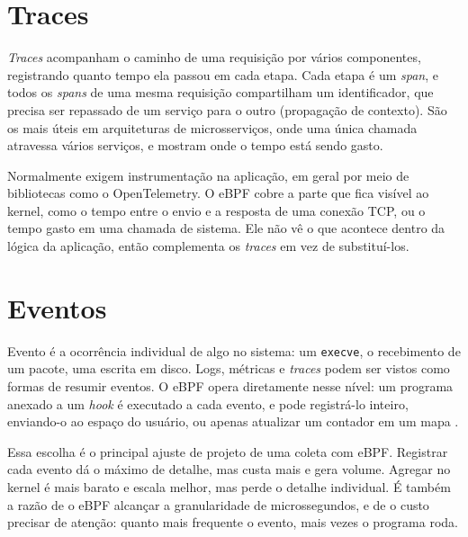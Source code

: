 \section{Traces}

\textit{Traces} acompanham o caminho de uma requisição por vários componentes, registrando quanto tempo ela passou em cada etapa. Cada etapa é um \textit{span}, e todos os \textit{spans} de uma mesma requisição compartilham um identificador, que precisa ser repassado de um serviço para o outro (propagação de contexto). São os mais úteis em arquiteturas de microsserviços, onde uma única chamada atravessa vários serviços, e mostram onde o tempo está sendo gasto.

Normalmente exigem instrumentação na aplicação, em geral por meio de bibliotecas como o OpenTelemetry. O eBPF cobre a parte que fica visível ao kernel, como o tempo entre o envio e a resposta de uma conexão TCP, ou o tempo gasto em uma chamada de sistema. Ele não vê o que acontece dentro da lógica da aplicação, então complementa os \textit{traces} em vez de substituí-los.

\section{Eventos}

Evento é a ocorrência individual de algo no sistema: um \texttt{execve}, o recebimento de um pacote, uma escrita em disco. Logs, métricas e \textit{traces} podem ser vistos como formas de resumir eventos. O eBPF opera diretamente nesse nível: um programa anexado a um \textit{hook} é executado a cada evento, e pode registrá-lo inteiro, enviando-o ao espaço do usuário, ou apenas atualizar um contador em um mapa \cite{gregg2019}.

Essa escolha é o principal ajuste de projeto de uma coleta com eBPF. Registrar cada evento dá o máximo de detalhe, mas custa mais e gera volume. Agregar no kernel é mais barato e escala melhor, mas perde o detalhe individual. É também a razão de o eBPF alcançar a granularidade de microssegundos, e de o custo precisar de atenção: quanto mais frequente o evento, mais vezes o programa roda.
